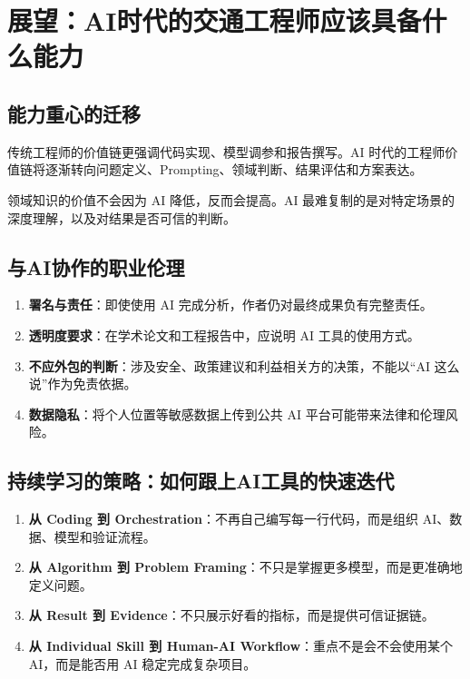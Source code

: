 \chapter{展望：AI时代的交通工程师应该具备什么能力}

\section{能力重心的迁移}

传统工程师的价值链更强调代码实现、模型调参和报告撰写。AI 时代的工程师价值链将逐渐转向问题定义、Prompting、领域判断、结果评估和方案表达。

领域知识的价值不会因为 AI 降低，反而会提高。AI 最难复制的是对特定场景的深度理解，以及对结果是否可信的判断。

\section{与AI协作的职业伦理}

\begin{enumerate}
  \item \textbf{署名与责任}：即使使用 AI 完成分析，作者仍对最终成果负有完整责任。
  \item \textbf{透明度要求}：在学术论文和工程报告中，应说明 AI 工具的使用方式。
  \item \textbf{不应外包的判断}：涉及安全、政策建议和利益相关方的决策，不能以“AI 这么说”作为免责依据。
  \item \textbf{数据隐私}：将个人位置等敏感数据上传到公共 AI 平台可能带来法律和伦理风险。
\end{enumerate}

\section{持续学习的策略：如何跟上AI工具的快速迭代}

\begin{enumerate}
  \item \textbf{从 Coding 到 Orchestration}：不再自己编写每一行代码，而是组织 AI、数据、模型和验证流程。
  \item \textbf{从 Algorithm 到 Problem Framing}：不只是掌握更多模型，而是更准确地定义问题。
  \item \textbf{从 Result 到 Evidence}：不只展示好看的指标，而是提供可信证据链。
  \item \textbf{从 Individual Skill 到 Human-AI Workflow}：重点不是会不会使用某个 AI，而是能否用 AI 稳定完成复杂项目。
\end{enumerate}
